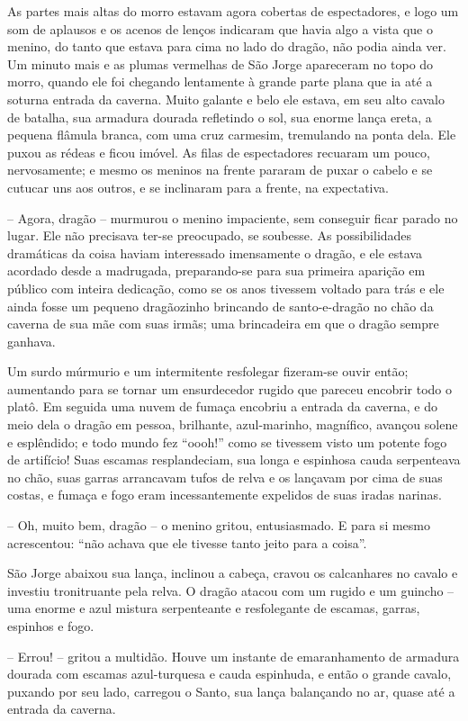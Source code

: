 As partes mais altas do morro estavam agora cobertas de espectadores,
e logo um som de aplausos e os acenos de lenços indicaram que havia
algo a vista que o menino, do tanto que estava para cima no lado do
dragão, não podia ainda ver. Um minuto mais e as plumas vermelhas de
São Jorge apareceram no topo do morro, quando ele foi chegando
lentamente à grande parte plana que ia até a soturna entrada da
caverna. Muito galante e belo ele estava, em seu alto cavalo de
batalha, sua armadura dourada refletindo o sol, sua enorme lança
ereta, a pequena flâmula branca, com uma cruz carmesim, tremulando na
ponta dela. Ele puxou as rédeas e ficou imóvel. As filas de
espectadores recuaram um pouco, nervosamente; e mesmo os meninos na
frente pararam de puxar o cabelo e se cutucar uns aos outros, e se
inclinaram para a frente, na expectativa.

-- Agora, dragão -- murmurou o menino impaciente, sem conseguir ficar
parado no lugar. Ele não precisava ter-se preocupado, se soubesse. As
possibilidades dramáticas da coisa haviam interessado imensamente o
dragão, e ele estava acordado desde a madrugada, preparando-se para
sua primeira aparição em público com inteira dedicação, como se os
anos tivessem voltado para trás e ele ainda fosse um pequeno
dragãozinho brincando de santo-e-dragão no chão da caverna de sua mãe
com suas irmãs; uma brincadeira em que o dragão sempre ganhava.

Um surdo múrmurio e um intermitente resfolegar fizeram-se ouvir então;
aumentando para se tornar um ensurdecedor rugido que pareceu encobrir
todo o platô. Em seguida uma nuvem de fumaça encobriu a entrada da
caverna, e do meio dela o dragão em pessoa, brilhante, azul-marinho,
magnífico, avançou solene e esplêndido; e todo mundo fez “oooh!” como
se tivessem visto um potente fogo de artifício! Suas escamas
resplandeciam, sua longa e espinhosa cauda serpenteava no chão, suas
garras arrancavam tufos de relva e os lançavam por cima de suas
costas, e fumaça e fogo eram incessantemente expelidos de suas iradas
narinas. 

-- Oh, muito bem, dragão -- o menino gritou, entusiasmado. E para si
mesmo acrescentou: “não achava que ele tivesse tanto jeito para a
coisa”.

São Jorge abaixou sua lança, inclinou a cabeça, cravou os calcanhares
no cavalo e investiu tronitruante pela relva. O dragão atacou com um
rugido e um guincho -- uma enorme e azul mistura serpenteante e
resfolegante de escamas, garras, espinhos e fogo.

-- Errou! -- gritou a multidão. Houve um instante de emaranhamento de
armadura dourada com escamas azul-turquesa e cauda espinhuda, e então
o grande cavalo, puxando por seu lado, carregou o Santo, sua lança
balançando no ar, quase até a entrada da caverna.


